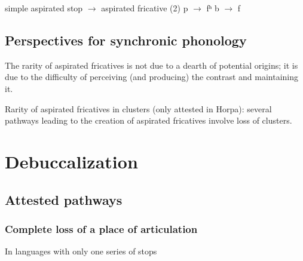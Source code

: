 \documentclass[oldfontcommands,oneside,a4paper,11pt]{article}
\begin{document}
\begin{exe}
\ex 
\glt simple aspirated stop $\rightarrow$ aspirated fricative (2)
\glt *p $\rightarrow$ fʰ
\glt *b $\rightarrow$ f
\end{exe}

\subsection{Perspectives for synchronic phonology}
\begin{exe}
\ex 
\glt The rarity of aspirated fricatives is not due to a dearth of potential origins; it is due to the difficulty of perceiving (and producing) the contrast and maintaining it.
\end{exe}
\begin{exe}
\ex 
\glt Rarity of aspirated fricatives in clusters (only attested in Horpa): several pathways leading to the creation of aspirated fricatives involve loss of clusters.
\end{exe}


\section{Debuccalization}
\subsection{Attested pathways}
 \subsubsection{Complete loss of a place of articulation}
In languages with only one series of stops 
 
\end{document}
